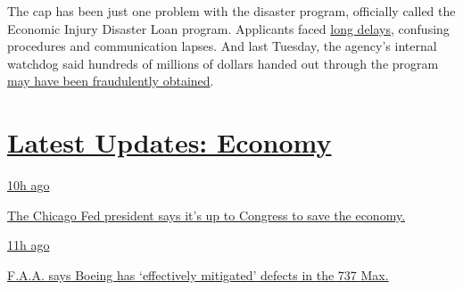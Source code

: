 The cap has been just one problem with the disaster program, officially
called the Economic Injury Disaster Loan program. Applicants faced
\href{https://www.nytimes3xbfgragh.onion/2020/04/09/business/smallbusiness/small-business-disaster-loans-coronavirus.html}{long
delays}, confusing procedures and communication lapses. And last
Tuesday, the agency's internal watchdog said hundreds of millions of
dollars handed out through the program
\href{https://www.nytimes3xbfgragh.onion/live/2020/07/28/business/stock-market-today-coronavirus\#thieves-are-targeting-small-business-relief-programs-a-watchdog-says}{may
have been fraudulently obtained}.

\hypertarget{latest-updates-economy}{%
\section{\texorpdfstring{\href{https://www.nytimes3xbfgragh.onion/live/2020/08/03/business/stock-market-today-coronavirus?action=click\&pgtype=Article\&state=default\&region=MAIN_CONTENT_1\&context=storylines_live_updates}{Latest
Updates:
Economy}}{Latest Updates: Economy}}\label{latest-updates-economy}}

\href{https://www.nytimes3xbfgragh.onion/live/2020/08/03/business/stock-market-today-coronavirus?action=click\&pgtype=Article\&state=default\&region=MAIN_CONTENT_1\&context=storylines_live_updates\#the-chicago-fed-president-says-its-up-to-congress-to-save-the-economy}{10h
ago}

\href{https://www.nytimes3xbfgragh.onion/live/2020/08/03/business/stock-market-today-coronavirus?action=click\&pgtype=Article\&state=default\&region=MAIN_CONTENT_1\&context=storylines_live_updates\#the-chicago-fed-president-says-its-up-to-congress-to-save-the-economy}{The
Chicago Fed president says it's up to Congress to save the economy.}

\href{https://www.nytimes3xbfgragh.onion/live/2020/08/03/business/stock-market-today-coronavirus?action=click\&pgtype=Article\&state=default\&region=MAIN_CONTENT_1\&context=storylines_live_updates\#faa-says-boeing-has-effectively-mitigated-defects-in-the-737-max}{11h
ago}

\href{https://www.nytimes3xbfgragh.onion/live/2020/08/03/business/stock-market-today-coronavirus?action=click\&pgtype=Article\&state=default\&region=MAIN_CONTENT_1\&context=storylines_live_updates\#faa-says-boeing-has-effectively-mitigated-defects-in-the-737-max}{F.A.A.
says Boeing has `effectively mitigated' defects in the 737 Max.}

